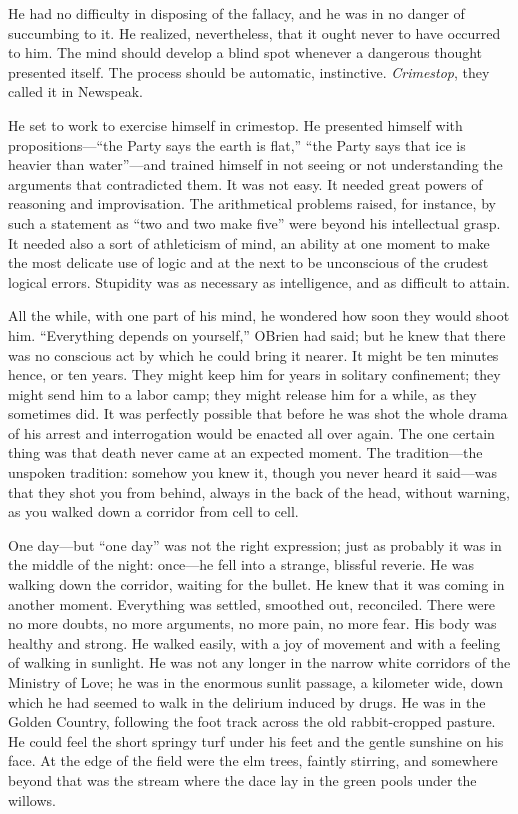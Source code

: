 He had no difficulty in disposing of the fallacy, and he was in no
danger of succumbing to it. He realized, nevertheless, that it ought
never to have occurred to him. The mind should develop a blind spot
whenever a dangerous thought presented itself. The process should be
automatic, instinctive. \emph{Crimestop}, they called it in Newspeak.

He set to work to exercise himself in crimestop. He presented himself
with propositions---``the Party says the earth is flat,'' ``the Party says
that ice is heavier than water''---and trained himself in not seeing or
not understanding the arguments that contradicted them. It was not easy.
It needed great powers of reasoning and improvisation. The arithmetical
problems raised, for instance, by such a statement as ``two and two make
five'' were beyond his intellectual grasp. It needed also a sort of
athleticism of mind, an ability at one moment to make the most delicate
use of logic and at the next to be unconscious of the crudest logical
errors. Stupidity was as necessary as intelligence, and as difficult to
attain.

All the while, with one part of his mind, he wondered how soon they
would shoot him. ``Everything depends on yourself,''
O\textquotesingle Brien had said; but he knew that there was no
conscious act by which he could bring it nearer. It might be ten minutes
hence, or ten years. They might keep him for years in solitary
confinement; they might send him to a labor camp; they might release him
for a while, as they sometimes did. It was perfectly possible that
before he was shot the whole drama of his arrest and interrogation would
be enacted all over again. The one certain thing was that death never
came at an expected moment. The tradition---the unspoken tradition:
somehow you knew it, though you never heard it said---was that they shot
you from behind, always in the back of the head, without warning, as you
walked down a corridor from cell to cell.

One day---but ``one day'' was not the right expression; just as probably
it was in the middle of the night: once---he fell into a strange,
blissful reverie. He was walking down the corridor, waiting for the
bullet. He knew that it was coming in another moment. Everything was
settled, smoothed out, reconciled. There were no more doubts, no more
arguments, no more pain, no more fear. His body was healthy and strong.
He walked easily, with a joy of movement and with a feeling of walking
in sunlight. He was not any longer in the narrow white corridors of the
Ministry of Love; he was in the enormous sunlit passage, a kilometer
wide, down which he had seemed to walk in the delirium induced by drugs.
He was in the Golden Country, following the foot track across the old
rabbit-cropped pasture. He could feel the short springy turf under his
feet and the gentle sunshine on his face. At the edge of the field were
the elm trees, faintly stirring, and somewhere beyond that was the
stream where the dace lay in the green pools under the willows.

